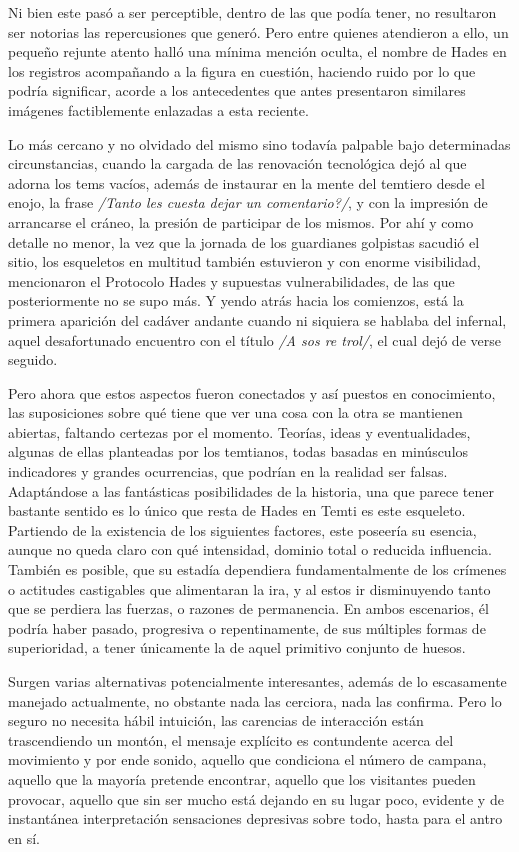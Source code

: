 \documentclass[
]{book}
\begin{document}
Ni bien este pasó a ser perceptible, dentro de las que podía tener, no resultaron ser notorias las repercusiones que generó. Pero entre quienes atendieron a ello, un pequeño rejunte atento halló una mínima mención oculta, el nombre de Hades en los registros acompañando a la figura en cuestión, haciendo ruido por lo que podría significar, acorde a los antecedentes que antes presentaron similares imágenes factiblemente enlazadas a esta reciente.

Lo más cercano y no olvidado del mismo sino todavía palpable bajo determinadas circunstancias, cuando la cargada de las renovación tecnológica dejó al que adorna los tems vacíos, además de instaurar en la mente del temtiero desde el enojo, la frase \emph{/Tanto les cuesta dejar un comentario?/}, y con la impresión de arrancarse el cráneo, la presión de participar de los mismos. Por ahí y como detalle no menor, la vez que la jornada de los guardianes golpistas sacudió el sitio, los esqueletos en multitud también estuvieron y con enorme visibilidad, mencionaron el Protocolo Hades y supuestas vulnerabilidades, de las que posteriormente no se supo más. Y yendo atrás hacia los comienzos, está la primera aparición del cadáver andante cuando ni siquiera se hablaba del infernal, aquel desafortunado encuentro con el título \emph{/A sos re trol/}, el cual dejó de verse seguido.

Pero ahora que estos aspectos fueron conectados y así puestos en conocimiento, las suposiciones sobre qué tiene que ver una cosa con la otra se mantienen abiertas, faltando certezas por el momento. Teorías, ideas y eventualidades, algunas de ellas planteadas por los temtianos, todas basadas en minúsculos indicadores y grandes ocurrencias, que podrían en la realidad ser falsas. Adaptándose a las fantásticas posibilidades de la historia, una que parece tener bastante sentido es lo único que resta de Hades en Temti es este esqueleto. Partiendo de la existencia de los siguientes factores, este poseería su esencia, aunque no queda claro con qué intensidad, dominio total o reducida influencia. También es posible, que su estadía dependiera fundamentalmente de los crímenes o actitudes castigables que alimentaran la ira, y al estos ir disminuyendo tanto que se perdiera las fuerzas, o razones de permanencia. En ambos escenarios, él podría haber pasado, progresiva o repentinamente, de sus múltiples formas de superioridad, a tener únicamente la de aquel primitivo conjunto de huesos.

Surgen varias alternativas potencialmente interesantes, además de lo escasamente manejado actualmente, no obstante nada las cerciora, nada las confirma. Pero lo seguro no necesita hábil intuición, las carencias de interacción están trascendiendo un montón, el mensaje explícito es contundente acerca del movimiento y por ende sonido, aquello que condiciona el número de campana, aquello que la mayoría pretende encontrar, aquello que los visitantes pueden provocar, aquello que sin ser mucho está dejando en su lugar poco, evidente y de instantánea interpretación sensaciones depresivas sobre todo, hasta para el antro en sí.
\end{document}
